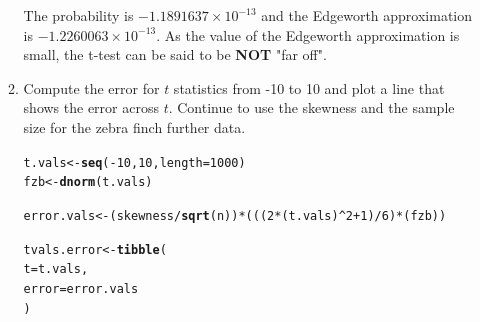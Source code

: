 \documentclass{article}\usepackage[]{graphicx}\usepackage[]{xcolor}
\makeatletter
\newcommand{\hlnum}[1]{\textcolor[rgb]{0.686,0.059,0.569}{#1}}%
\newcommand{\hlopt}[1]{\textcolor[rgb]{0,0,0}{#1}}%
\newcommand{\hldef}[1]{\textcolor[rgb]{0.345,0.345,0.345}{#1}}%
\newcommand{\hlkwb}[1]{\textcolor[rgb]{0.69,0.353,0.396}{#1}}%
\newcommand{\hlkwc}[1]{\textcolor[rgb]{0.333,0.667,0.333}{#1}}%
\newcommand{\hlkwd}[1]{\textcolor[rgb]{0.737,0.353,0.396}{\textbf{#1}}}%
\newenvironment{kframe}{%
 \def\at@end@of@kframe{}%
 \ifinner\ifhmode%
  \def\at@end@of@kframe{\end{minipage}}%
  \begin{minipage}{\columnwidth}%
 \fi\fi%
 \def\FrameCommand##1{\hskip\@totalleftmargin \hskip-\fboxsep
 \colorbox{shadecolor}{##1}\hskip-\fboxsep
     \hskip-\linewidth \hskip-\@totalleftmargin \hskip\columnwidth}%
 \MakeFramed {\advance\hsize-\width
   \@totalleftmargin\z@ \linewidth\hsize
   \@setminipage}}%
 {\par\unskip\endMakeFramed%
 \at@end@of@kframe}
\newenvironment{knitrout}{}{} %
\makeatother
\begin{document}
\begin{enumerate}
\begin{enumerate}
The probability is \ensuremath{-1.1891637\times 10^{-13}} and the Edgeworth approximation is \ensuremath{-1.2260063\times 10^{-13}}. As the value of the Edgeworth approximation is small, the t-test can be said to be \textbf{NOT} "far off".

  \item Compute the error for $t$ statistics from -10 to 10 and plot a line
  that shows the error across $t$. Continue to use the skewness and 
  the sample size for the zebra finch further data.
  
\begin{knitrout}
\color{fgcolor}\begin{kframe}
\begin{alltt}
\hldef{t.vals} \hlkwb{<-} \hlkwd{seq}\hldef{(}\hlopt{-}\hlnum{10}\hldef{,}\hlnum{10}\hldef{,} \hlkwc{length} \hldef{=} \hlnum{1000}\hldef{)}
\hldef{fzb} \hlkwb{<-} \hlkwd{dnorm}\hldef{(t.vals)}

\hldef{error.vals} \hlkwb{<-} \hldef{(skewness}\hlopt{/}\hlkwd{sqrt}\hldef{(n))} \hlopt{*} \hldef{(((}\hlnum{2}\hlopt{*}\hldef{(t.vals)}\hlopt{^}\hlnum{2} \hlopt{+} \hlnum{1}\hldef{)}\hlopt{/}\hlnum{6}\hldef{)}\hlopt{*}\hldef{(fzb))}

\hldef{tvals.error} \hlkwb{<-} \hlkwd{tibble}\hldef{(}
  \hlkwc{t} \hldef{= t.vals,}
  \hlkwc{error} \hldef{= error.vals}
\hldef{)}


\end{alltt}
\end{kframe}
\end{knitrout}
\end{enumerate}
\end{enumerate}
\end{document}
